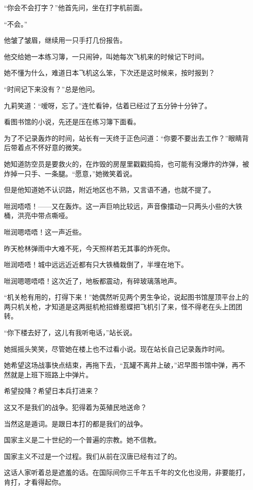 \par “你会不会打字？”他首先问，坐在打字机前面。
\par “不会。”
\par 他皱了皱眉，继续用一只手打几份报告。
\par 他交给她一本练习簿，一只闹钟，叫她每次飞机来的时候记下时间。
\par 她不懂为什么，难道日本飞机这么笨，下次还是这时候来，按时报到？
\par “时间记下来没有？”总是他问。
\par 九莉笑道：“嗳呀，忘了。”连忙看钟，估着已经过了五分钟十分钟了。
\par 看图书馆的小说，先还是压在练习簿下面看。
\par 为了不记录轰炸的时间，站长有一天终于正色问道：“你要不要出去工作？”眼睛背后带着点不怀好意的微笑。
\par 她知道防空员是要救火的，在炸毁的房屋里戳戳捣捣，也可能有没爆炸的炸弹，被炸掉一只手、一条腿。“愿意，”她微笑着说。
\par 但是他知道她不认识路，附近地区也不熟，又言语不通，也就不提了。
\par 咝润唔唔！——又在轰炸。这一声巨响比较远，声音像擂动一只两头小些的大铁桶，洪亮中带点嘶哑。
\par 咝润嗯唔唔！这一声近些。
\par 昨天枪林弹雨中大难不死，今天照样若无其事的炸死你。
\par 咝润唔唔！城中远远近近都有只大铁桶栽倒了，半埋在地下。
\par 咝润嗯嗯唔唔！这次近了，地板都震动，有碎玻璃落地声。
\par “机关枪有用的，打得下来！”她偶然听见两个男生争论，说起图书馆屋顶平台上的两只机关枪，才知道是这两挺机枪招蜂惹蝶把飞机引了来，怪不得老在头上团团转。
\par “你下楼去好了，这儿有我听电话，”站长说。
\par 她摇摇头笑笑，尽管她在楼上也不过看小说。现在站长自己记录轰炸时间。
\par 她希望这场战事快点结束，再拖下去，“瓦罐不离井上破，”迟早图书馆中弹，再不然就是上班下班路上中弹片。
\par 希望投降？希望日本兵打进来？
\par 这又不是我们的战争。犯得着为英殖民地送命？
\par 当然这是遁词。是跟日本打的都是我们的战争。
\par 国家主义是二十世纪的一个普遍的宗教。她不信教。
\par 国家主义不过是一个过程。我们从前在汉唐已经有过了的。
\par 这话人家听着总是遮羞的话。在国际间你三千年五千年的文化也没用，非要能打，肯打，才看得起你。
